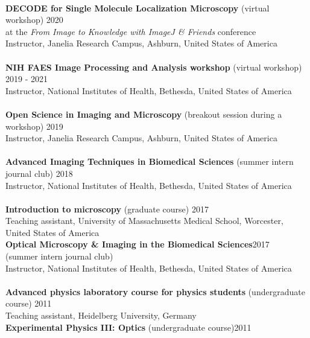 \documentclass[margin,line]{res}
\begin{document}
\begin{resume}
\vspace*{-3mm}\\
{\bf DECODE for Single Molecule Localization Microscopy} (virtual workshop)  \hfill 2020\\
at the \emph{From Image to Knowledge with ImageJ \& Friends} conference\\
Instructor, Janelia Research Campus, Ashburn, United States of America\\
\vspace*{-3mm}\\
{\bf  NIH FAES Image Processing and Analysis workshop} (virtual workshop)  \hfill 2019 - 2021\\
 Instructor, National Institutes of Health, Bethesda, United States of America\\
\vspace*{-3mm}\\
{\bf  Open Science in Imaging and Microscopy} (breakout session during a workshop)  \hfill 2019\\
Instructor, Janelia Research Campus, Ashburn, United States of America\\
\vspace*{-3mm}\\
{\bf Advanced Imaging Techniques in Biomedical Sciences} (summer intern journal club) \hfill {2018}\\
Instructor, National Institutes of Health, Bethesda, United States of America \\
\vspace*{-3mm}\\
{\bf Introduction to microscopy} (graduate course) \hfill {2017}\\
Teaching assistant, University of Massachusetts Medical School, Worcester, \\
United States of America\\
{\bf Optical Microscopy \& Imaging in the Biomedical Sciences}\hfill {2017}\\
 (summer intern journal club) \\
 Instructor, National Institutes of Health, Bethesda, United States of America \\
\vspace*{-3mm}\\
{\bf Advanced physics laboratory course for physics students} (undergraduate course) \hfill {2011}\\
Teaching assistant, Heidelberg University, Germany\\
{\bf Experimental Physics III: Optics}  (undergraduate course)\hfill {2011}\\

\end{resume}
\end{document}
